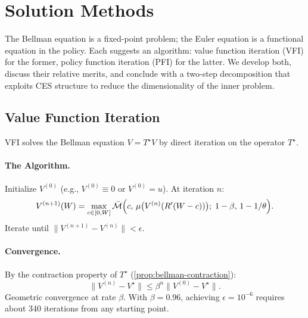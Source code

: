 \section{Solution Methods}
\label{sec:dp-solution}

The Bellman equation is a fixed-point problem; the Euler equation is a functional equation in the policy. Each suggests an algorithm: value function iteration (VFI) for the former, policy function iteration (PFI) for the latter. We develop both, discuss their relative merits, and conclude with a two-step decomposition that exploits CES structure to reduce the dimensionality of the inner problem.

\subsection{Value Function Iteration}
\label{subsec:dp-vfi}

VFI solves the Bellman equation $V = T^\star V$ by direct iteration on the operator $T^\star$.

\paragraph{The Algorithm.}
Initialize $V^{(0)}$ (e.g., $V^{(0)} \equiv 0$ or $V^{(0)} = u$). At iteration $n$:
\begin{equation}
V^{(n+1)}(W) = \max_{c \in [0, W]} \bar{\mathcal{M}}\Big( c, \, \mu\big( V^{(n)}(R'(W-c)) \big); \; 1-\beta, \, 1-1/\theta \Big).
\label{eq:vfi-step}
\end{equation}
Iterate until $\|V^{(n+1)} - V^{(n)}\| < \epsilon$.

\paragraph{Convergence.}
By the contraction property of $T^\star$ (\cref{prop:bellman-contraction}):
\begin{equation}
\|V^{(n)} - V^\star\| \leq \beta^n \|V^{(0)} - V^\star\|.
\label{eq:vfi-convergence}
\end{equation}
Geometric convergence at rate $\beta$. With $\beta = 0.96$, achieving $\epsilon = 10^{-6}$ requires about 340 iterations from any starting point.

